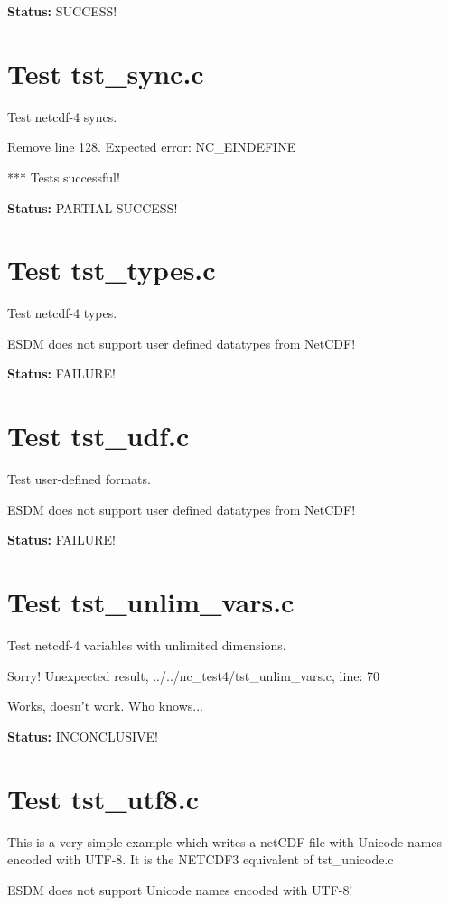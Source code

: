 {\bf \large Status: } SUCCESS!

\section{Test tst\_sync.c}

Test netcdf-4 syncs.

Remove line 128. Expected error: NC\_EINDEFINE

*** Tests successful!

{\bf \large Status: } PARTIAL SUCCESS!

\section{Test tst\_types.c}

Test netcdf-4 types.

ESDM does not support user defined datatypes from NetCDF!

{\bf \large Status: } FAILURE!

\section{Test tst\_udf.c}

Test user-defined formats.

ESDM does not support user defined datatypes from NetCDF!

{\bf \large Status: } FAILURE!

\section{Test tst\_unlim\_vars.c}

Test netcdf-4 variables with unlimited dimensions.

Sorry! Unexpected result, ../../nc\_test4/tst\_unlim\_vars.c, line: 70

Works, doesn't work. Who knows...

{\bf \large Status: } INCONCLUSIVE!

\section{Test tst\_utf8.c}

This is a very simple example which writes a netCDF file with Unicode names encoded with UTF-8. It is the NETCDF3 equivalent of tst\_unicode.c

ESDM does not support Unicode names encoded with UTF-8!


